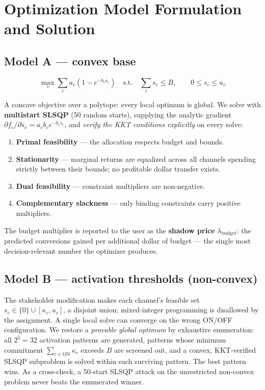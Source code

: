 \documentclass[11pt]{article}
\begin{document}
\section{Optimization Model Formulation and Solution}

\subsection{Model A --- convex base}

\[
\max_{s} \sum_c a_c\left(1 - e^{-b_c s_c}\right)
\quad \text{s.t.} \quad \sum_c s_c \le B, \qquad 0 \le s_c \le u_c
\]

A concave objective over a polytope: every local optimum is global. We solve with \textbf{multistart SLSQP} (50 random starts), supplying the analytic gradient $\partial f_c / \partial s_c = a_c b_c e^{-b_c s_c}$, and \emph{verify the KKT conditions explicitly} on every solve:

\begin{enumerate}[nosep]
  \item \textbf{Primal feasibility} --- the allocation respects budget and bounds.
  \item \textbf{Stationarity} --- marginal returns are equalized across all channels spending strictly between their bounds; no profitable dollar transfer exists.
  \item \textbf{Dual feasibility} --- constraint multipliers are non-negative.
  \item \textbf{Complementary slackness} --- only binding constraints carry positive multipliers.
\end{enumerate}

The budget multiplier is reported to the user as the \textbf{shadow price} $\lambda_{\text{budget}}$: the predicted conversions gained per additional dollar of budget --- the single most decision-relevant number the optimizer produces.

\subsection{Model B --- activation thresholds (non-convex)}

The stakeholder modification makes each channel's feasible set $s_c \in \{0\} \cup [\kappa_c, u_c]$, a disjoint union; mixed-integer programming is disallowed by the assignment. A single local solve can converge on the wrong ON/OFF configuration. We restore a \emph{provable global optimum} by exhaustive enumeration: all $2^5 = 32$ activation patterns are generated, patterns whose minimum commitment $\sum_{c \in \text{ON}} \kappa_c$ exceeds $B$ are screened out, and a convex, KKT-verified SLSQP subproblem is solved within each surviving pattern. The best pattern wins. As a cross-check, a 50-start SLSQP attack on the unrestricted non-convex problem never beats the enumerated winner.
\end{document}
